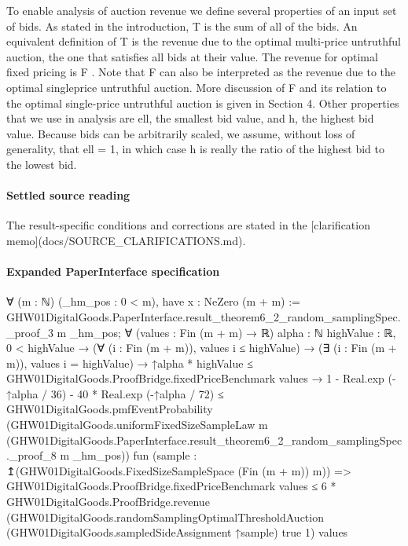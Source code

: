 \documentclass[10pt]{article}
\begin{document}
\begin{ReviewVerbatim}
To enable analysis of auction revenue we define several properties of an input set of bids. As stated in
the introduction, T is the sum of all of the bids. An
equivalent definition of T is the revenue due to the
optimal multi-price untruthful auction, the one that
satisfies all bids at their value. The revenue for optimal fixed pricing is F . Note that F can also be
interpreted as the revenue due to the optimal singleprice untruthful auction. More discussion of F and
its relation to the optimal single-price untruthful auction is given in Section 4. Other properties that we
use in analysis are ell, the smallest bid value, and h,
the highest bid value. Because bids can be arbitrarily scaled, we assume, without loss of generality, that
ell = 1, in which case h is really the ratio of the highest
bid to the lowest bid.
\end{ReviewVerbatim}

\paragraph{Settled source reading}
\begin{sloppypar}
The result-\allowbreak{}specific conditions and corrections are stated in the [clarification memo](docs/\allowbreak{}SOURCE\_\allowbreak{}CLARIFICATIONS.\allowbreak{}md).\allowbreak{}
\end{sloppypar}

\paragraph{Expanded PaperInterface specification}
\begin{ReviewVerbatim}
∀ (m : ℕ) (_hm_pos : 0 < m),
  have x : NeZero (m + m) := GHW01DigitalGoods.PaperInterface.result_theorem6_2_random_samplingSpec._proof_3 m _hm_pos;
  ∀ (values : Fin (m + m) → ℝ) {alpha : ℕ} {highValue : ℝ},
    0 < highValue →
      (∀ (i : Fin (m + m)), values i ≤ highValue) →
        (∃ (i : Fin (m + m)), values i = highValue) →
          ↑alpha * highValue ≤ GHW01DigitalGoods.ProofBridge.fixedPriceBenchmark values →
            1 - Real.exp (-↑alpha / 36) - 40 * Real.exp (-↑alpha / 72) ≤
              GHW01DigitalGoods.pmfEventProbability
                (GHW01DigitalGoods.uniformFixedSizeSampleLaw m
                  (GHW01DigitalGoods.PaperInterface.result_theorem6_2_random_samplingSpec._proof_8 m _hm_pos))
                fun (sample : ↥(GHW01DigitalGoods.FixedSizeSampleSpace (Fin (m + m)) m)) =>
                GHW01DigitalGoods.ProofBridge.fixedPriceBenchmark values ≤
                  6 *
                    GHW01DigitalGoods.ProofBridge.revenue
                      (GHW01DigitalGoods.randomSamplingOptimalThresholdAuction
                        (GHW01DigitalGoods.sampledSideAssignment ↑sample) true 1)
                      values
\end{ReviewVerbatim}
\end{document}
